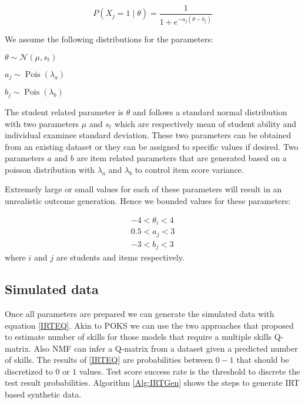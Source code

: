 \newcommand\pN{\mathcal{N}}

\begin{equation}
P(X_j\!=\!1\;|\;\theta) = \frac{1}{1+e^{-a_j(\theta-b_j)}}
\label{IRTEQ}
\end{equation}

We assume the following distributions for the parameters:

\begin{center}
$\theta \sim \pN(\mu, s_t)$

$a_j \sim \operatorname{Pois} \left({\lambda_a}\right)$

$b_j \sim \operatorname{Pois} \left({\lambda_b}\right)$
\end{center}


The student related parameter is $\theta$ and follows a standard normal distribution with two parameters $\mu$ and $s_t$ which are respectively mean of student ability and individual examinee standard deviation. These two parameters can be obtained from an existing dataset or they can be assigned to specific values if desired. Two parameters $a$ and $b$ are item related parameters that are generated based on a poisson distribution with $\lambda_a$ and $\lambda_b$ to control item score variance.

Extremely large or small values for each of these parameters will result in an unrealistic outcome generation. Hence we bounded values for these parameters:

\begin{eqnarray*}
-4 < \theta_i < 4\\
0.5 < a_j < 3\\
-3 < b_j < 3
\end{eqnarray*}
where $i$ and $j$ are students and items respectively.

\subsection{Simulated data}

Once all parameters are prepared we can generate the simulated data with equation \ref{IRTEQ}. Akin to POKS we can use the two approaches that \citet{Beheshti2012Numbers} proposed to estimate number of skills for those models that require a multiple skills Q-matrix. Also NMF can infer a Q-matrix from a dataset given a predicted number of skills. The results of \ref{IRTEQ} are probabilities between $0-1$ that should be discretized to $0$ or $1$ values. Test score success rate is the threshold to discrete the test result probabilities. Algorithm \ref{Alg:IRTGen} shows the steps to generate IRT based synthetic data.

